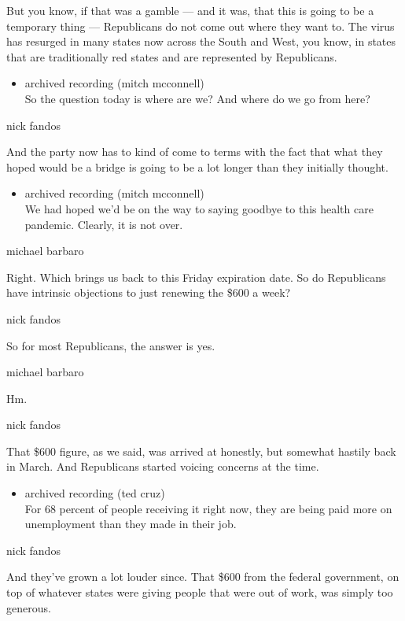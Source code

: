 But you know, if that was a gamble --- and it was, that this is going to
be a temporary thing --- Republicans do not come out where they want to.
The virus has resurged in many states now across the South and West, you
know, in states that are traditionally red states and are represented by
Republicans.

\begin{itemize}
\tightlist
\item
  archived recording (mitch mcconnell)\\
  So the question today is where are we? And where do we go from here?
\end{itemize}

nick fandos

And the party now has to kind of come to terms with the fact that what
they hoped would be a bridge is going to be a lot longer than they
initially thought.

\begin{itemize}
\tightlist
\item
  archived recording (mitch mcconnell)\\
  We had hoped we'd be on the way to saying goodbye to this health care
  pandemic. Clearly, it is not over.
\end{itemize}

michael barbaro

Right. Which brings us back to this Friday expiration date. So do
Republicans have intrinsic objections to just renewing the \$600 a week?

nick fandos

So for most Republicans, the answer is yes.

michael barbaro

Hm.

nick fandos

That \$600 figure, as we said, was arrived at honestly, but somewhat
hastily back in March. And Republicans started voicing concerns at the
time.

\begin{itemize}
\tightlist
\item
  archived recording (ted cruz)\\
  For 68 percent of people receiving it right now, they are being paid
  more on unemployment than they made in their job.
\end{itemize}

nick fandos

And they've grown a lot louder since. That \$600 from the federal
government, on top of whatever states were giving people that were out
of work, was simply too generous.

